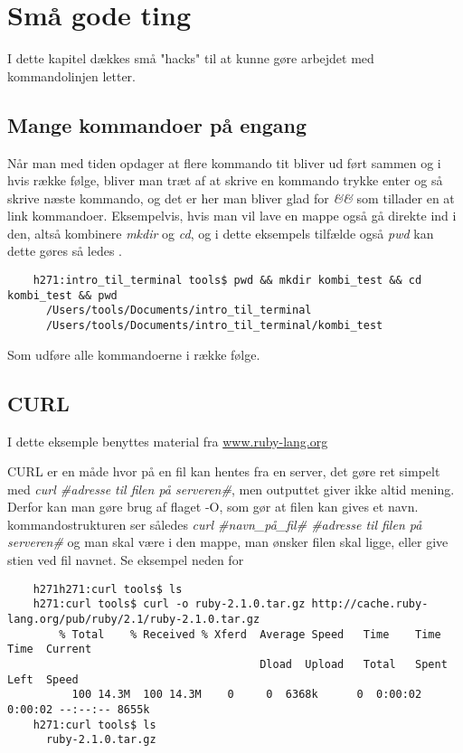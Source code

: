 \chapter{Små gode ting}
I dette kapitel dækkes små "hacks" til at kunne gøre arbejdet med kommandolinjen letter.
\section{Mange kommandoer på engang}
Når man med tiden opdager at flere kommando tit bliver ud ført sammen og i hvis række følge, bliver man træt af at skrive en kommando trykke enter og så skrive næste kommando, og det er her man bliver glad for \textit{\&\&} som tillader en at link kommandoer.
Eksempelvis, hvis man vil lave en mappe også gå direkte ind i den, altså kombinere \textit{mkdir} og \textit{cd}, og i dette eksempels tilfælde også \textit{pwd} kan dette gøres så ledes .
\begin{lstlisting}
	h271:intro_til_terminal tools$ pwd && mkdir kombi_test && cd kombi_test && pwd
	  /Users/tools/Documents/intro_til_terminal
	  /Users/tools/Documents/intro_til_terminal/kombi_test 
\end{lstlisting}
Som udføre alle kommandoerne i række følge. 

\section{CURL}
I dette eksemple benyttes material fra \href{http:www.ruby-lang.org}{www.ruby-lang.org} \par
CURL er en måde hvor på en fil kan hentes fra en server, det gøre ret simpelt med \textit{curl \#adresse til filen på serveren\#}, men outputtet giver ikke altid mening. Derfor kan man gøre brug af flaget -O, som gør at filen kan gives et navn. kommandostrukturen ser således \textit{curl \#navn\_på\_fil\# \#adresse til filen på serveren\#} og man skal være i den mappe, man ønsker filen skal ligge, eller give stien ved fil navnet. Se eksempel neden for 

\begin{lstlisting}
	h271h271:curl tools$ ls
	h271:curl tools$ curl -o ruby-2.1.0.tar.gz http://cache.ruby-lang.org/pub/ruby/2.1/ruby-2.1.0.tar.gz
	    % Total    % Received % Xferd  Average Speed   Time    Time     Time  Current
	                                   Dload  Upload   Total   Spent    Left  Speed
          100 14.3M  100 14.3M    0     0  6368k      0  0:00:02  0:00:02 --:--:-- 8655k
	h271:curl tools$ ls
	  ruby-2.1.0.tar.gz
\end{lstlisting}


